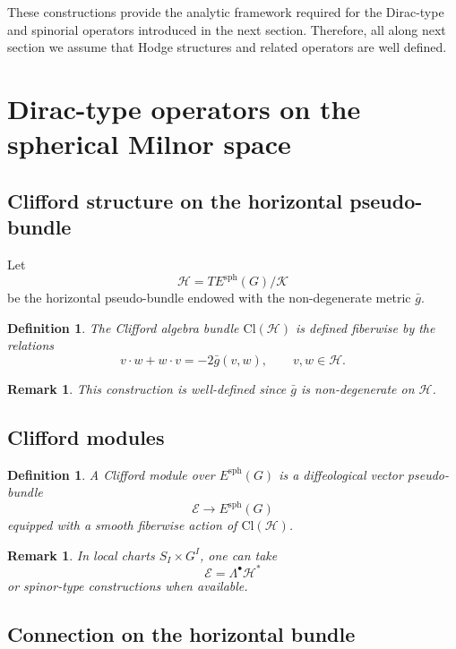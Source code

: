 \documentclass[11pt]{amsart}
\newtheorem{definition}[theorem]{Definition}
\newtheorem{remark}[theorem]{Remark}
\begin{document}
These constructions provide the analytic framework required for the
Dirac-type and spinorial operators introduced in the next section.
Therefore, all along next section we assume that Hodge structures and related operators are well defined. 
\section{Dirac-type operators on the spherical Milnor space} \label{8}

\subsection{Clifford structure on the horizontal pseudo-bundle}

Let
\[
\mathcal H = TE^{\mathrm{sph}}(G)/\mathcal K
\]
be the horizontal pseudo-bundle endowed with the non-degenerate metric $\bar g$.

\begin{definition}
The Clifford algebra bundle $\mathrm{Cl}(\mathcal H)$ is defined fiberwise by the relations
\[
v \cdot w + w \cdot v = -2 \bar g(v,w),
\qquad v,w \in \mathcal H.
\]
\end{definition}

\begin{remark}
This construction is well-defined since $\bar g$ is non-degenerate on $\mathcal H$.
\end{remark}

\subsection{Clifford modules}

\begin{definition}
A \emph{Clifford module} over $E^{\mathrm{sph}}(G)$ is a diffeological vector pseudo-bundle
\[
\mathcal E \longrightarrow E^{\mathrm{sph}}(G)
\]
equipped with a smooth fiberwise action of $\mathrm{Cl}(\mathcal H)$.
\end{definition}

\begin{remark}
In local charts $S_I \times G^I$, one can take
\[
\mathcal E = \Lambda^\bullet \mathcal H^*
\]
or spinor-type constructions when available.
\end{remark}

\subsection{Connection on the horizontal bundle}
\end{document}
